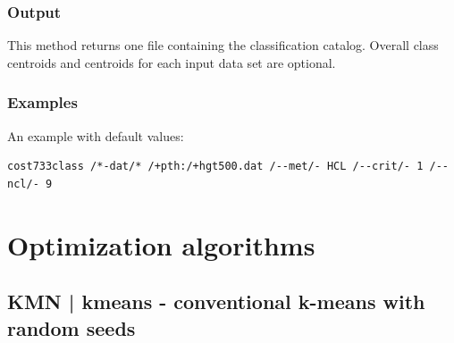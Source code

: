 \documentclass[12pt, oneside, a4paper, headsepline, plainheadsepline]{scrbook}
\begin{document}
\subsubsection*{Output}
This method returns one file containing the classification catalog. 
Overall class centroids and centroids for each input data set are optional.

\subsubsection*{Examples}
An example with default values:
\begin{lstlisting}
cost733class /*-dat/* /+pth:/+hgt500.dat /--met/- HCL /--crit/- 1 /--ncl/- 9  
\end{lstlisting}


\section{Optimization algorithms}

\subsection{KMN | kmeans - conventional k-means with random seeds}
\label{kmeans}
\end{document}
